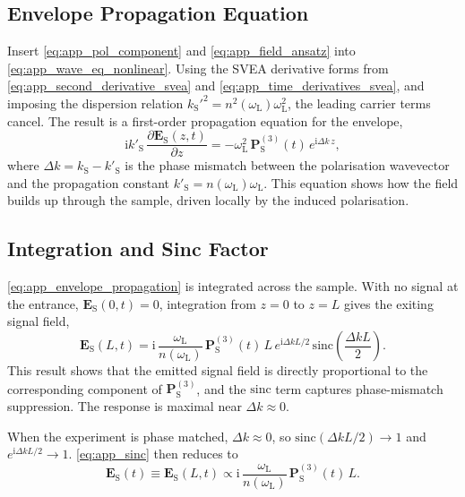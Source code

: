 \subsection{Envelope Propagation Equation}
\label{app:subsec:envelope_propagation}

Insert \autoref{eq:app_pol_component} and \autoref{eq:app_field_ansatz} into \autoref{eq:app_wave_eq_nonlinear}. Using the SVEA derivative forms from \autoref{eq:app_second_derivative_svea} and \autoref{eq:app_time_derivatives_svea}, and imposing the dispersion relation $k_{\mathrm{S}}'^2=n^2(\omega_{\mathrm{L}})\omega_{\mathrm{L}}^2$, the leading carrier terms cancel. The result is a first-order propagation equation for the envelope,
\begin{equation}
	\mathrm{i} k'_{\mathrm{S}}\,\frac{\partial \boldsymbol{E}_{\mathrm{S}}(z,t)}{\partial z}
	= -\omega_{\mathrm{L}}^2\,\boldsymbol{P}_{\mathrm{S}}^{(3)}(t)\,e^{\mathrm{i}\Delta k\,z},
	\label{eq:app_envelope_propagation}
\end{equation}
where $\Delta k = k_{\mathrm{S}} - k'_{\mathrm{S}}$ is the phase mismatch between the polarisation wavevector and the propagation constant $k'_{\mathrm{S}} = n(\omega_{\mathrm{L}})\omega_{\mathrm{L}}$. This equation shows how the field builds up through the sample, driven locally by the induced polarisation.

\subsection{Integration and Sinc Factor}
\label{app:subsec:integration_sinc}

\autoref{eq:app_envelope_propagation} is integrated across the sample. With no signal at the entrance, $\boldsymbol{E}_{\mathrm{S}}(0,t)=0$, integration from $z=0$ to $z=L$ gives the exiting signal field,
\begin{equation}
	\boldsymbol{E}_{\mathrm{S}}(L,t)
	= \mathrm{i}\,\frac{\omega_{\mathrm{L}}}{n(\omega_{\mathrm{L}})}\,\boldsymbol{P}_{\mathrm{S}}^{(3)}(t)\,L\,e^{\mathrm{i}\Delta k L/2}\,\mathrm{sinc}\!\left(\frac{\Delta k L}{2}\right).
	\label{eq:app_sinc}
\end{equation}
This result shows that the emitted signal field is directly proportional to the corresponding component of $\boldsymbol{P}_{\mathrm{S}}^{(3)}$, and the $\mathrm{sinc}$ term captures phase-mismatch suppression. The response is maximal near $\Delta k \approx 0$.

When the experiment is phase matched, $\Delta k\approx 0$, so $\mathrm{sinc}(\Delta k L/2)\to 1$ and $e^{\mathrm{i}\Delta k L/2}\to 1$. \autoref{eq:app_sinc} then reduces to
\begin{equation*}
	\boldsymbol{E}_{\mathrm{S}}(t)\equiv \boldsymbol{E}_{\mathrm{S}}(L,t)
	\propto \mathrm{i}\,\frac{\omega_{\mathrm{L}}}{n(\omega_{\mathrm{L}})}\,\boldsymbol{P}_{\mathrm{S}}^{(3)}(t)\,L.
\end{equation*}

